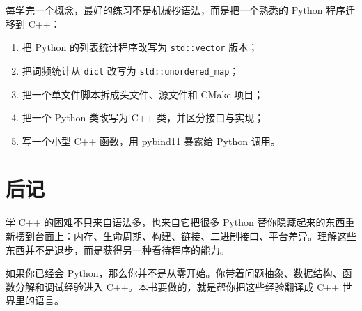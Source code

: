 \documentclass[UTF8,openany]{ctexbook}
\begin{document}
每学完一个概念，最好的练习不是机械抄语法，而是把一个熟悉的 Python 程序迁移到 C++：

\begin{enumerate}[noitemsep]
  \item 把 Python 的列表统计程序改写为 \texttt{std::vector} 版本；
  \item 把词频统计从 \texttt{dict} 改写为 \texttt{std::unordered\_map}；
  \item 把一个单文件脚本拆成头文件、源文件和 CMake 项目；
  \item 把一个 Python 类改写为 C++ 类，并区分接口与实现；
  \item 写一个小型 C++ 函数，用 pybind11 暴露给 Python 调用。
\end{enumerate}

\backmatter

\chapter{后记}

学 C++ 的困难不只来自语法多，也来自它把很多 Python 替你隐藏起来的东西重新摆到台面上：内存、生命周期、构建、链接、二进制接口、平台差异。理解这些东西并不是退步，而是获得另一种看待程序的能力。

如果你已经会 Python，那么你并不是从零开始。你带着问题抽象、数据结构、函数分解和调试经验进入 C++。本书要做的，就是帮你把这些经验翻译成 C++ 世界里的语言。
\end{document}

